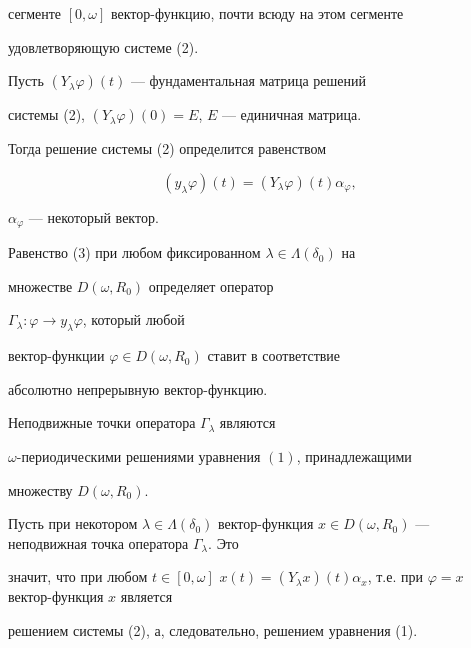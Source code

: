 сегменте $[0,\omega]$ вектор-функцию, почти всюду на этом сегменте 


удовлетворяющую системе (2). 


 


Пусть $(Y_\lambda\varphi)(t)$ --- фундаментальная матрица решений 


системы (2), $(Y_\lambda\varphi)(0)=E$, $E$ --- единичная матрица. 


Тогда решение системы (2) определится равенством 


\begin{equation} 


(y_\lambda\varphi)(t)=(Y_\lambda\varphi)(t)\alpha_\varphi, 


\end{equation} 


$\alpha_\varphi$ --- некоторый вектор. 


 


Равенство (3) при любом фиксированном $\lambda\in\Lambda(\delta_0)$ на 


множестве $D(\omega,R_0)$ определяет оператор 


$\Gamma_\lambda:\varphi\to y_\lambda\varphi$, который любой 


вектор-функции $\varphi\in D(\omega,R_0)$ ставит в соответствие 


абсолютно непрерывную вектор-функцию. 


 


\begin{thm} 


Неподвижные точки оператора $\Gamma_\lambda$ являются 


$\omega$-периодическими решениями уравнения $(1)$, принадлежащими 


множеству $D(\omega,R_0)$. 


\end{thm} 


 


\begin{pf} 


Пусть при некотором $\lambda\in\Lambda(\delta_0)$ вектор-функция $x\in 


D(\omega,R_0)$ --- неподвижная точка оператора $\Gamma_\lambda$. Это 


значит, что при любом $t\in[0,\omega]$\; $x(t)=(Y_\lambda 


x)(t)\alpha_x$, т.е. при $\varphi=x$ вектор-функция $x$ является 


решением системы (2), а, следовательно, решением уравнения (1). 


\end{pf} 


